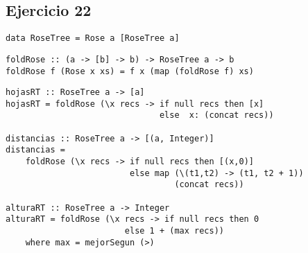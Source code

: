 \subsection{Ejercicio 22}
\begin{centrado}
    \begin{verbatim}
data RoseTree = Rose a [RoseTree a]   
    \end{verbatim}
\end{centrado}

\begin{centrado}
    \begin{verbatim}
foldRose :: (a -> [b] -> b) -> RoseTree a -> b
foldRose f (Rose x xs) = f x (map (foldRose f) xs)
    \end{verbatim}
\end{centrado}

\begin{centrado}
    \begin{verbatim}
hojasRT :: RoseTree a -> [a]
hojasRT = foldRose (\x recs -> if null recs then [x]
                               else  x: (concat recs))

distancias :: RoseTree a -> [(a, Integer)]
distancias = 
    foldRose (\x recs -> if null recs then [(x,0)]
                         else map (\(t1,t2) -> (t1, t2 + 1)) 
                                  (concat recs))

alturaRT :: RoseTree a -> Integer
alturaRT = foldRose (\x recs -> if null recs then 0
                        else 1 + (max recs))
    where max = mejorSegun (>)
    \end{verbatim}
\end{centrado}